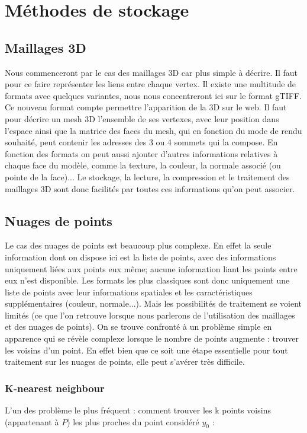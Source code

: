 \section{Méthodes de stockage}

\subsection{Maillages 3D}
Nous commenceront par le cas des maillages 3D car plus simple à décrire. Il faut pour ce faire représenter les liens entre chaque vertex. Il existe une multitude de formats avec quelques variantes, nous nous concentreront ici sur le format gTIFF. Ce nouveau format compte permettre l'apparition de la 3D sur le web. Il faut pour décrire un mesh 3D l'ensemble de ses vertexes, avec leur position dans l'espace ainsi que la matrice des faces du mesh, qui en fonction du mode de rendu souhaité, peut contenir les adresses des 3 ou 4 sommets qui la compose. En fonction des formats on peut aussi ajouter d'autres informations relatives à chaque face du modèle, comme la texture, la couleur, la normale associé (ou pointe de la face)... 
Le stockage, la lecture, la compression et le traitement des maillages 3D sont donc facilités par toutes ces informations qu'on peut associer.

\subsection{Nuages de points}
Le cas des nuages de points est beaucoup plus complexe. En effet la seule information dont on dispose ici est la liste de points, avec des informations uniquement liées aux points eux même; aucune information liant les points entre eux n'est disponible. Les formats les plus classiques sont donc uniquement une liste de points avec leur informations spatiales et les caractéristiques supplémentaires (couleur, normale...). Mais les possibilités de traitement se voient limités (ce que l'on retrouve lorsque nous parlerons de l'utilisation des maillages et des nuages de points). On se trouve confronté à un problème simple en apparence qui se révèle complexe lorsque le nombre de points augmente : trouver les voisins d'un point. En effet bien que ce soit une étape essentielle pour tout traitement sur les nuages de points, elle peut s'avérer très difficile.

\subsubsection{K-nearest neighbour}
 L'un des problème le plus fréquent : comment trouver les k points voisins (appartenant à $P$) les plus proches du point considéré $y_{0}$ :
 
